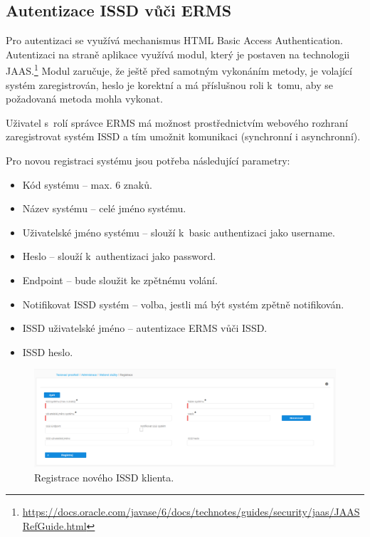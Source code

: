\documentclass[
  master,
  field=ainfp,
  biblatex,
  language=czech,
  glossaries,
  theorems=false,
  index
]{kidiplom}
\begin{document}
\subsection{Autentizace ISSD vůči ERMS}\label{ch:issd}


Pro autentizaci se využívá mechanismus HTML Basic Access Authentication.  Autentizaci na straně aplikace využívá modul, který je postaven na technologii \gls{JAAS}.\footnote{\url{https://docs.oracle.com/javase/6/docs/technotes/guides/security/jaas/JAASRefGuide.html}} Modul zaručuje, že ještě před samotným vykonáním metody, je volající systém zaregistrován, heslo je korektní a má příslušnou roli k~tomu, aby se požadovaná metoda mohla vykonat.

Uživatel s~rolí správce ERMS má možnost prostřednictvím webového rozhraní zaregistrovat systém ISSD a tím umožnit komunikaci (synchronní i asynchronní).

Pro novou registraci systému jsou potřeba následující parametry:
\begin{itemize}
	\item Kód systému -- max. 6 znaků.
	\item Název systému -- celé jméno systému.
	\item Uživatelské jméno systému -- slouží k~basic authentizaci jako username.
	\item Heslo -- slouží k~authentizaci jako password.
	\item Endpoint -- bude sloužit ke zpětnému volání.
	\item Notifikovat ISSD systém -- volba, jestli má být systém zpětně notifikován.
	\item ISSD uživatelské jméno -- autentizace ERMS vůči ISSD.
	\item ISSD heslo.
\end{itemize}

\begin{figure}[h]
  \centerline{\includegraphics[width=0.9\linewidth]{./images/ISSDRegistration.png}} 
  \caption{Registrace nového ISSD klienta.} 
\end{figure}
\end{document}
